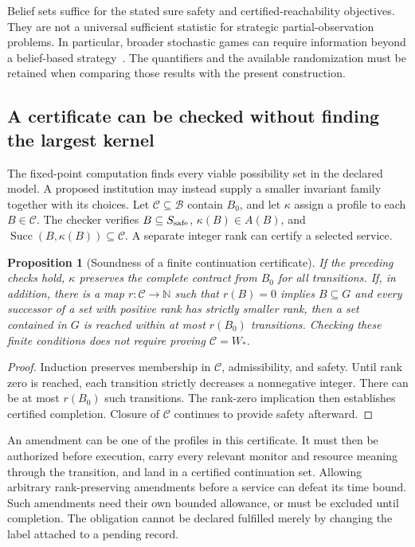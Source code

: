 \documentclass[11pt,letterpaper]{article}
\theoremstyle{plain}
\newtheorem{proposition}{Proposition}[section]
\theoremstyle{definition}
\theoremstyle{remark}
\begin{document}
Belief sets suffice for the stated sure safety and certified-reachability objectives. They are not a universal sufficient statistic for strategic partial-observation problems. In particular, broader stochastic games can require information beyond a belief-based strategy~\cite{belieffails}. The quantifiers and the available randomization must be retained when comparing those results with the present construction.

\subsection{A certificate can be checked without finding the largest kernel}
The fixed-point computation finds every viable possibility set in the declared model. A proposed institution may instead supply a smaller invariant family together with its choices. Let $\mathcal C\subseteq\mathcal B$ contain $B_0$, and let $\kappa$ assign a profile to each $B\in\mathcal C$. The checker verifies $B\subseteq S_{\rm safe}$, $\kappa(B)\in A(B)$, and $\operatorname{Succ}(B,\kappa(B))\subseteq\mathcal C$. A separate integer rank can certify a selected service.

\begin{proposition}[Soundness of a finite continuation certificate]\label{prop:continuation-certificate}
If the preceding checks hold, $\kappa$ preserves the complete contract from $B_0$ for all transitions. If, in addition, there is a map $r:\mathcal C\to\mathbb N$ such that $r(B)=0$ implies $B\subseteq G$ and every successor of a set with positive rank has strictly smaller rank, then a set contained in $G$ is reached within at most $r(B_0)$ transitions. Checking these finite conditions does not require proving $\mathcal C=W_*$.
\end{proposition}
\begin{proof}
Induction preserves membership in $\mathcal C$, admissibility, and safety. Until rank zero is reached, each transition strictly decreases a nonnegative integer. There can be at most $r(B_0)$ such transitions. The rank-zero implication then establishes certified completion. Closure of $\mathcal C$ continues to provide safety afterward.
\end{proof}

An amendment can be one of the profiles in this certificate. It must then be authorized before execution, carry every relevant monitor and resource meaning through the transition, and land in a certified continuation set. Allowing arbitrary rank-preserving amendments before a service can defeat its time bound. Such amendments need their own bounded allowance, or must be excluded until completion. The obligation cannot be declared fulfilled merely by changing the label attached to a pending record.
\end{document}
